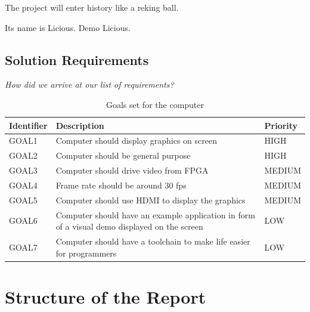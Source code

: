 \documentclass[../main/report.tex]{subfiles}
\begin{document}
The project will enter history like a reking ball.

Its name is Licious. Demo Licious.

\subsection{Solution Requirements}

\textit{How did we arrive at our list of requirements?}

\begin{table}[htp]
    \centering
    \begin{tabular}{|l|p{8cm}|l|}
        \hline
        \textbf{Identifier}           & \textbf{Description}                & \textbf{Priority} \\ \hline
        GOAL1  & Computer should display graphics on screen                           & HIGH    \\ \hline
        GOAL2  & Computer should be general purpose                                   & HIGH    \\ \hline
        GOAL3  & Computer should drive video from FPGA                                & MEDIUM  \\ \hline
        GOAL4  & Frame rate should be around 30 fps                                   & MEDIUM  \\ \hline
        GOAL5  & Computer should use HDMI to display the graphics                     & MEDIUM  \\ \hline
        GOAL6  & Computer should have an example application in form of a visual demo displayed on the screen       & LOW     \\ \hline
        GOAL7  & Computer should have a toolchain to make life easier for programmers & LOW     \\ \hline
    \end{tabular}
    \caption{Goals set for the computer}
    \label{tab:goals}
\end{table}

\newpage
\section{Structure of the Report}

\end{document}
